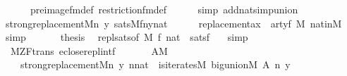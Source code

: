 \begin{isabellebody}
\ \ \ \ \ \ pre{\isacharunderscore}{\kern0pt}image{\isacharunderscore}{\kern0pt}fm{\isacharunderscore}{\kern0pt}def\ restriction{\isacharunderscore}{\kern0pt}fm{\isacharunderscore}{\kern0pt}def\isanewline
\ \ \ \ \isamarkupfalse%
\ {\isacharparenleft}{\kern0pt}simp\ add{\isacharcolon}{\kern0pt}nat{\isacharunderscore}{\kern0pt}simp{\isacharunderscore}{\kern0pt}union{\isacharparenright}{\kern0pt}\isanewline
\ \ \isamarkupfalse%
\isanewline
\ \ \isamarkupfalse%
\ {\isachardoublequoteopen}strong{\isacharunderscore}{\kern0pt}replacement{\isacharparenleft}{\kern0pt}{\isacharhash}{\kern0pt}{\isacharhash}{\kern0pt}M{\isacharcomma}{\kern0pt}{\isasymlambda}n\ y{\isachardot}{\kern0pt}\ sats{\isacharparenleft}{\kern0pt}M{\isacharcomma}{\kern0pt}{\isacharquery}{\kern0pt}f{\isacharcomma}{\kern0pt}{\isacharbrackleft}{\kern0pt}n{\isacharcomma}{\kern0pt}y{\isacharcomma}{\kern0pt}{}{\isacharcomma}{\kern0pt}nat{\isacharbrackright}{\kern0pt}{\isacharparenright}{\kern0pt}{\isacharparenright}{\kern0pt}{\isachardoublequoteclose}\isanewline
\ \ \ \ \isamarkupfalse%
\ replacement{\isacharunderscore}{\kern0pt}ax\ {}\ artyf\ {\isacartoucheopen}{}{\isasymin}M{\isacartoucheclose}\ nat{\isacharunderscore}{\kern0pt}in{\isacharunderscore}{\kern0pt}M\ \isamarkupfalse%
\ simp\isanewline
\ \ \isamarkupfalse%
\isanewline
\ \ \isamarkupfalse%
\ {\isacharquery}{\kern0pt}thesis\ \isamarkupfalse%
\ repl{\isacharunderscore}{\kern0pt}sats{\isacharbrackleft}{\kern0pt}of\ M\ {\isacharquery}{\kern0pt}f\ {\isachardoublequoteopen}{\isacharbrackleft}{\kern0pt}{}{\isacharcomma}{\kern0pt}nat{\isacharbrackright}{\kern0pt}{\isachardoublequoteclose}{\isacharbrackright}{\kern0pt}\ \ satsf\ \ \isamarkupfalse%
\ simp\isanewline
{}\isamarkupfalse%
%
\endisatagproof
{\isafoldproof}%
%
\isadelimproof
\isanewline
%
\endisadelimproof
\isanewline
\isanewline
\isanewline
\isanewline
{}\isamarkupfalse%
\ {\isacharparenleft}{\kern0pt}\ M{\isacharunderscore}{\kern0pt}ZF{\isacharunderscore}{\kern0pt}trans{\isacharparenright}{\kern0pt}\ eclose{\isacharunderscore}{\kern0pt}repl{}{\isacharunderscore}{\kern0pt}intf{\isacharcolon}{\kern0pt}\isanewline
\ \ \isanewline
\ \ \ \ {\isachardoublequoteopen}A{\isasymin}M{\isachardoublequoteclose}\isanewline
\ \ \isanewline
\ \ \ \ {\isachardoublequoteopen}strong{\isacharunderscore}{\kern0pt}replacement{\isacharparenleft}{\kern0pt}{\isacharhash}{\kern0pt}{\isacharhash}{\kern0pt}M{\isacharcomma}{\kern0pt}{\isasymlambda}n\ y{\isachardot}{\kern0pt}\ n{\isasymin}nat\ {\isacharampersand}{\kern0pt}\ is{\isacharunderscore}{\kern0pt}iterates{\isacharparenleft}{\kern0pt}{\isacharhash}{\kern0pt}{\isacharhash}{\kern0pt}M{\isacharcomma}{\kern0pt}\ big{\isacharunderscore}{\kern0pt}union{\isacharparenleft}{\kern0pt}{\isacharhash}{\kern0pt}{\isacharhash}{\kern0pt}M{\isacharparenright}{\kern0pt}{\isacharcomma}{\kern0pt}\ A{\isacharcomma}{\kern0pt}\ n{\isacharcomma}{\kern0pt}\ y{\isacharparenright}{\kern0pt}{\isacharparenright}{\kern0pt}{\isachardoublequoteclose}\isanewline

\end{isabellebody}
